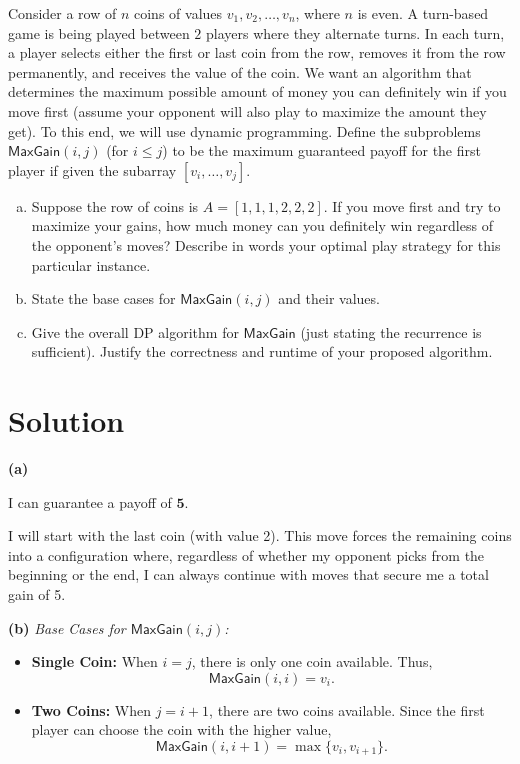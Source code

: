 \documentclass[11pt]{article}
\begin{document}
    \begin{tcolorbox}[title={Problem 3 (The Coin Game, 35 points)}] \setlength\parindent{1em}
        
    Consider a row of $n$ coins of values $v_1, v_2, \dots, v_n$, where $n$ is even. A turn-based game is being played between
    $2$ players where they alternate turns. In each turn, a player selects either the first or last coin from the
    row, removes it from the row permanently, and receives the value of the coin. We want an algorithm that
    determines the maximum possible amount of money you can definitely win if you move first (assume your
    opponent will also play to maximize the amount they get). To this end, we will use dynamic programming.
    Define the subproblems $\mathsf{MaxGain}(i, j)$ (for $i \leq j$) to be the maximum guaranteed payoff for the first player if given the subarray $[v_i,  \dots, v_j]$.
    \begin{enumerate}[(a)]
    \item Suppose the row of coins is $A=[1,1,1,2,2,2]$. If you move first and try to maximize your gains, how much money can you definitely win regardless
    of the opponent’s moves? Describe in words your optimal play strategy for this particular instance.
    \item State the base cases for $\mathsf{MaxGain}(i, j)$ and their values.
    \item Give the overall DP algorithm for  $\mathsf{MaxGain}$ (just stating the recurrence is sufficient). Justify the correctness and runtime of your proposed algorithm.

    \end{enumerate}
    \end{tcolorbox}
    
    \section*{Solution}
        \textbf{(a)}
        
        I can guarantee a payoff of \(\mathbf{5}\). 
        
        I will start with the last coin (with value 2). This move forces the remaining coins into a configuration where, regardless of whether my opponent picks from the beginning or the end, I can
        always continue with moves that secure me a total gain of 5.
        \bigskip
        
        \textbf{(b)} \emph{Base Cases for \(\mathsf{MaxGain}(i,j)\):}
        \begin{itemize}
            \item \textbf{Single Coin:} When \(i = j\), there is only one coin available. Thus,
            \[
            \mathsf{MaxGain}(i,i) = v_i.
            \]
            \item \textbf{Two Coins:} When \(j = i+1\), there are two coins available. Since the first player can choose the coin with the higher value,
            \[
            \mathsf{MaxGain}(i,i+1) = \max\{v_i, v_{i+1}\}.
            \]
        \end{itemize}
        
\end{document}
